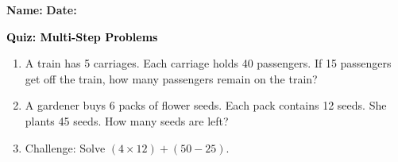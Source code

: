 \documentclass[12pt, letterpaper, fleqn]{article}
\begin{document}
\textbf{Name:} \underline{\hspace{5cm}}
\hfill
\textbf{Date:} \underline{\hspace{3cm}}\\

\begin{tcolorbox}[colback=customteal!20]
    \large\textcolor{black}{\textbf{Quiz: Multi-Step Problems}}
\end{tcolorbox}

\vspace{5mm}
\begin{enumerate}[itemsep=3.5cm, leftmargin=0.6cm]
\item A train has 5 carriages. Each carriage holds 40 passengers. If 15 passengers get off the train, how many passengers remain on the train?
\vspace{3.5cm}

\item A gardener buys 6 packs of flower seeds. Each pack contains 12 seeds. She plants 45 seeds. How many seeds are left?
\vspace{3.5cm}

\item Challenge: Solve $(4 \times 12) + (50 - 25)$.
\end{enumerate}
\end{document}
